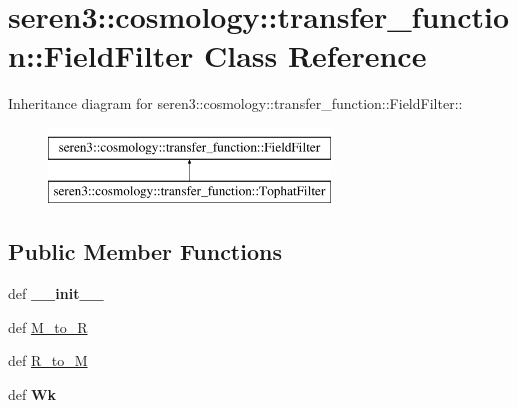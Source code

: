 \hypertarget{classseren3_1_1cosmology_1_1transfer__function_1_1FieldFilter}{
\section{seren3::cosmology::transfer\_\-function::FieldFilter Class Reference}
\label{classseren3_1_1cosmology_1_1transfer__function_1_1FieldFilter}
}
Inheritance diagram for seren3::cosmology::transfer\_\-function::FieldFilter::\begin{figure}[H]
\begin{center}
\leavevmode
\includegraphics[height=2cm]{classseren3_1_1cosmology_1_1transfer__function_1_1FieldFilter}
\end{center}
\end{figure}
\subsection*{Public Member Functions}
\begin{DoxyCompactItemize}
\item 
\hypertarget{classseren3_1_1cosmology_1_1transfer__function_1_1FieldFilter_a74689f9cafa461507873f871245b2288}{
def {\bfseries \_\-\_\-init\_\-\_\-}}
\label{classseren3_1_1cosmology_1_1transfer__function_1_1FieldFilter_a74689f9cafa461507873f871245b2288}

\item 
def \hyperlink{classseren3_1_1cosmology_1_1transfer__function_1_1FieldFilter_a983db94a6d9f16eff701bcc09bc9224a}{M\_\-to\_\-R}
\item 
def \hyperlink{classseren3_1_1cosmology_1_1transfer__function_1_1FieldFilter_affac12da7c98b51f64935da1c98f4d11}{R\_\-to\_\-M}
\item 
\hypertarget{classseren3_1_1cosmology_1_1transfer__function_1_1FieldFilter_a97ac5c897947cb8f09b60dcdf6fbbd9f}{
def {\bfseries Wk}}
\label{classseren3_1_1cosmology_1_1transfer__function_1_1FieldFilter_a97ac5c897947cb8f09b60dcdf6fbbd9f}

\end{DoxyCompactItemize}


